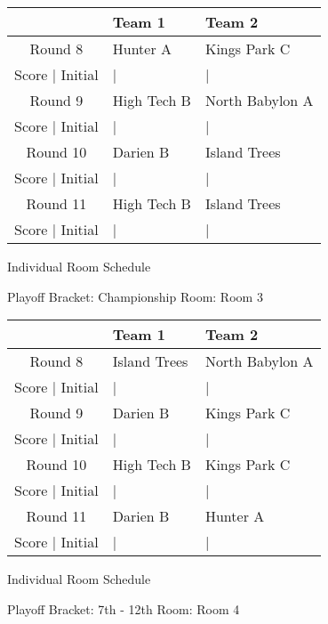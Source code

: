\documentclass{article}%
\begin{document}
%
\begin{tabularx}{\textwidth}{|c|Y|Y|}%
\hline%
&Team 1&Team 2\\%
\hline%
Round 8&Hunter A&Kings Park C\\%
\hline%
Score | Initial&|&|\\%
\hline%
Round 9&High Tech B&North Babylon A\\%
\hline%
Score | Initial&|&|\\%
\hline%
Round 10&Darien B&Island Trees\\%
\hline%
Score | Initial&|&|\\%
\hline%
Round 11&High Tech B&Island Trees\\%
\hline%
Score | Initial&|&|\\%
\hline%
\end{tabularx}%
\vspace*{16pt}%
\linebreak%
\newpage%
\begin{center}%
\begin{Huge}%
Individual Room Schedule%
\end{Huge}%
\vspace*{16pt}%
\linebreak%
\begin{Large}%
Playoff Bracket: Championship \hfill Room: Room 3%
\end{Large}%
\end{center}%
%
\begin{tabularx}{\textwidth}{|c|Y|Y|}%
\hline%
&Team 1&Team 2\\%
\hline%
Round 8&Island Trees&North Babylon A\\%
\hline%
Score | Initial&|&|\\%
\hline%
Round 9&Darien B&Kings Park C\\%
\hline%
Score | Initial&|&|\\%
\hline%
Round 10&High Tech B&Kings Park C\\%
\hline%
Score | Initial&|&|\\%
\hline%
Round 11&Darien B&Hunter A\\%
\hline%
Score | Initial&|&|\\%
\hline%
\end{tabularx}%
\vspace*{16pt}%
\linebreak%
\newpage%
\begin{center}%
\begin{Huge}%
Individual Room Schedule%
\end{Huge}%
\vspace*{16pt}%
\linebreak%
\begin{Large}%
Playoff Bracket: 7th - 12th \hfill Room: Room 4%
\end{Large}%
\end{center}%
\end{document}
